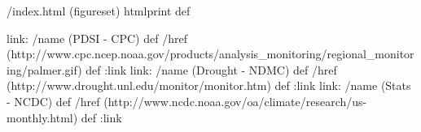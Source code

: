 /index.html {(figureset) htmlprint} def
\begin{ingrid}
link:
/name (PDSI - CPC) def
/href (http://www.cpc.ncep.noaa.gov/products/analysis_monitoring/regional_monitoring/palmer.gif) def
:link
link:
/name (Drought - NDMC) def
/href (http://www.drought.unl.edu/monitor/monitor.htm) def
:link
link:
/name (Stats - NCDC) def
/href (http://www.ncdc.noaa.gov/oa/climate/research/us-monthly.html) def
:link

\end{ingrid}
